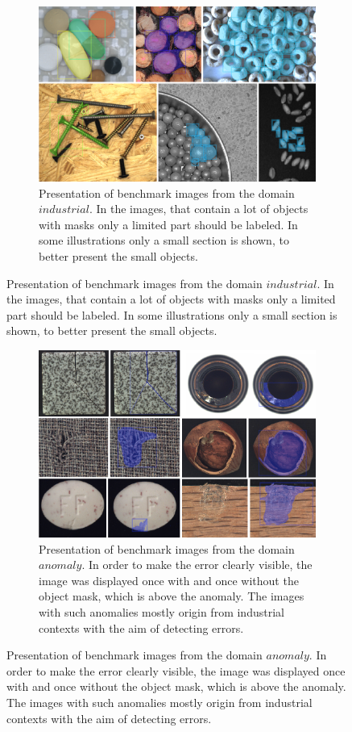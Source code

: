 \begin{figure} \ContinuedFloat
	\begin{subfigure}[t]{1.0\textwidth} 
		\centering
		\includegraphics[width=\textwidth]{figures/appendix/benchmark_dataset_examples/industrial_collage.png}
		\caption{
			Presentation of benchmark images from the domain $ industrial $.
			In the images, that contain a lot of objects with masks only a limited part should be labeled.		
			In some illustrations only a small section is shown, to better present the small objects.
		} \label{fig:appendix_domain_industrial}
	\end{subfigure}
\end{figure}
	
\begin{figure} \ContinuedFloat
	\begin{subfigure}[t]{1.0\textwidth} 
		\centering
		\includegraphics[width=\textwidth]{figures/appendix/benchmark_dataset_anomaly_examples/anomaly_collage.png}
		\caption{
			Presentation of benchmark images from the domain $ anomaly $.
			In order to make the error clearly visible, the image was displayed once with and once without the object mask, which is above the anomaly.
			The images with such anomalies mostly origin from industrial contexts with the aim of detecting errors.			
		} \label{fig:appendix_domain_anomaly}
	\end{subfigure}
\end{figure}